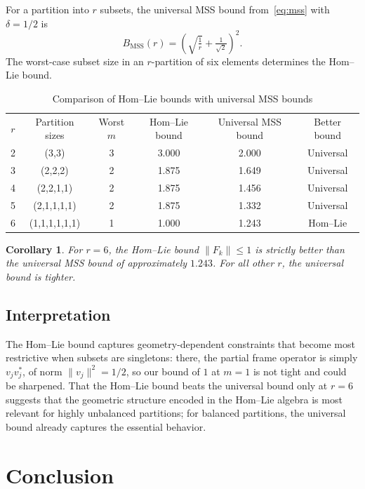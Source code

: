\documentclass[a4paper]{amsart}
\theoremstyle{plain}
\newtheorem{corollary}[theorem]{Corollary}
\theoremstyle{definition}
\theoremstyle{remark}
\begin{document}
	For a partition into $r$ subsets, the universal MSS bound from~\eqref{eq:mss} with $\delta = 1/2$ is
	\[
	B_{\text{MSS}}(r) = \left(\sqrt{\tfrac{1}{r}} + \tfrac{1}{\sqrt{2}}\right)^2.
	\]
	The worst-case subset size in an $r$-partition of six elements determines the Hom--Lie bound.
	
	\begin{table}[h]
		\centering
		\begin{tabular}{|c|c|c|c|c|c|}\hline
			$r$ & Partition sizes & Worst $m$ & Hom--Lie bound & Universal MSS bound & Better bound \\ \hhline{|=|=|=|=|=|=|}
			2 & (3,3) & 3 & 3.000 & 2.000 & Universal \\ \hline
			3 & (2,2,2) & 2 & 1.875 & 1.649 & Universal \\ \hline
			4 & (2,2,1,1) & 2 & 1.875 & 1.456 & Universal \\ \hline
			5 & (2,1,1,1,1) & 2 & 1.875 & 1.332 & Universal \\ \hline
			6 & (1,1,1,1,1,1) & 1 & 1.000 & 1.243 & Hom--Lie \\ \hline
		\end{tabular}
		\vspace{0.1in}
		\caption{Comparison of Hom--Lie bounds with universal MSS bounds}
		\label{tab:comparison}
	\end{table}
	
	\begin{corollary} For $r=6$, the Hom--Lie bound $\|F_k\| \le 1$ is strictly better than the universal MSS bound of approximately $1.243$. For all other $r$, the universal bound is tighter.
	\end{corollary}
	
	\subsection{Interpretation}
	\label{subsec:interpretation}
	
	The Hom--Lie bound captures geometry-dependent constraints that become most restrictive when subsets are singletons: there, the partial frame operator is simply $v_jv_j^*$, of norm $\|v_j\|^2=1/2$, so our bound of $1$ at $m=1$ is not tight and could be sharpened. That the Hom--Lie bound beats the universal bound only at $r=6$ suggests that the geometric structure encoded in the Hom--Lie algebra is most relevant for highly unbalanced partitions; for balanced partitions, the universal bound already captures the essential behavior.
	
	\section{Conclusion}
	\label{sec:conclusion}
	
\end{document}
